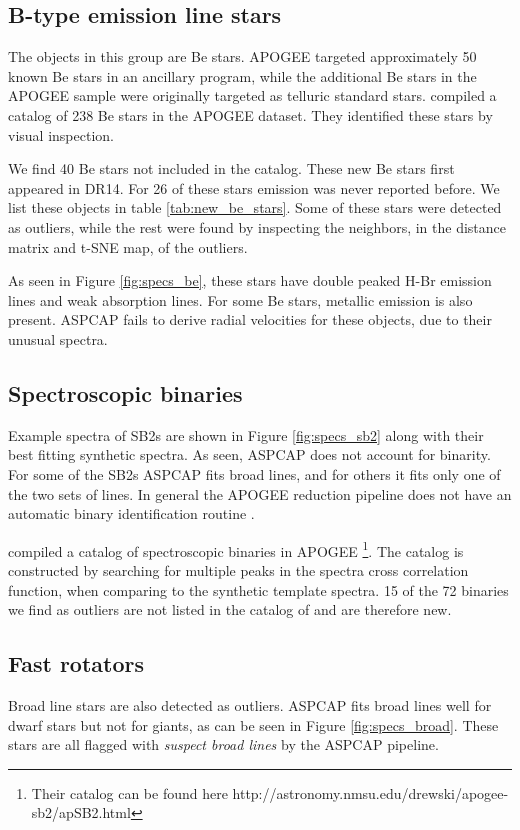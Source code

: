 \documentclass[fleqn,usenatbib]{mnras}
\begin{document}
\subsection{B-type emission line stars}
The objects in this group are Be stars. APOGEE targeted approximately 50 known Be stars in an ancillary program, while the additional Be stars in the APOGEE sample were originally targeted as telluric standard stars. 
\citet{chojnowski15,chojnowski17} compiled a catalog of 238 Be stars in the APOGEE dataset. They identified these stars by visual inspection.


We find 40 Be stars not included in the \citet{chojnowski15} catalog. These new Be stars first appeared in DR14. For 26 of these stars emission was never reported before. We list these objects in table \ref{tab:new_be_stars}. Some of these stars were detected as outliers, while the rest were found by inspecting the neighbors, in the distance matrix and t-SNE map, of the outliers.


As seen in Figure \ref{fig:specs_be}, these stars have double peaked H-Br emission lines and weak absorption lines. For some Be stars, metallic emission is also present. ASPCAP fails to derive radial velocities for these objects, due to their unusual spectra. 




\subsection{Spectroscopic binaries}
Example spectra of SB2s are shown in Figure \ref{fig:specs_sb2} along with their best fitting synthetic spectra. 
As seen, ASPCAP does not account for binarity.  For some of the SB2s ASPCAP fits broad lines, and for others it fits only one of the two sets of lines. In general the APOGEE reduction pipeline does not have an automatic binary identification routine \citep{nidever15}. 


\citet{chojnowski15a} compiled a catalog of spectroscopic binaries in APOGEE \footnote{Their catalog can be found here http://astronomy.nmsu.edu/drewski/apogee-sb2/apSB2.html}. The catalog is constructed by searching for multiple peaks in the spectra cross correlation function, when comparing to the synthetic template spectra. 15 of the 72 binaries we find as outliers are not listed in the catalog of \citet{chojnowski15a} and are therefore new. 




\subsection{Fast rotators}
Broad line stars are also detected as outliers. ASPCAP fits broad lines well for dwarf stars but not for giants, as can be seen in Figure \ref{fig:specs_broad}. These stars are all flagged with \textit{suspect broad lines} by the ASPCAP pipeline.  
\end{document}
